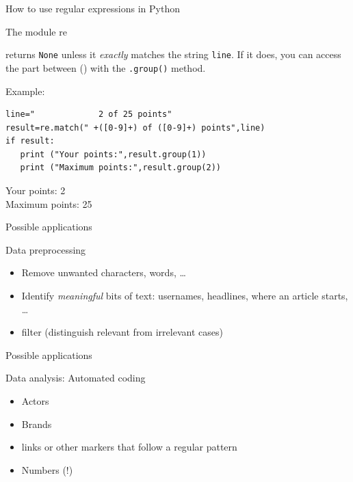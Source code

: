 \documentclass{beamer}
\begin{document}
\begin{frame}[fragile]{How to use regular expressions in Python}
\begin{block}{The module re}
\begin{description}
\item<1->[{\tt{re.match(" +(\lbrack 0-9\rbrack +) of (\lbrack 0-9\rbrack +) points",line)}}] returns  \texttt{None} unless it \emph{exactly} matches the string \texttt{line}. If it does, you can access the part between () with the \texttt{.group()} method.
\end{description}
\end{block}

Example:
\begin{lstlisting}
line="             2 of 25 points"
result=re.match(" +([0-9]+) of ([0-9]+) points",line)
if result:
   print ("Your points:",result.group(1))
   print ("Maximum points:",result.group(2))
\end{lstlisting}
Your points: 2\\
Maximum points: 25
\end{frame}














\begin{frame}{Possible applications}
\begin{block}{Data preprocessing}
\begin{itemize}
\item Remove unwanted characters, words, \ldots
\item Identify \emph{meaningful} bits of text: usernames, headlines, where an article starts, \ldots
\item filter (distinguish relevant from irrelevant cases)
\end{itemize}
\end{block}
\end{frame}


\begin{frame}{Possible applications}
\begin{block}{Data analysis: Automated coding}
\begin{itemize}
\item Actors
\item Brands
\item links or other markers that follow a regular pattern
\item Numbers (!)
\end{itemize}
\end{block}
\end{frame}
\end{document}
